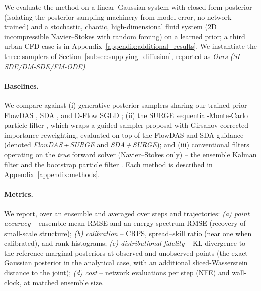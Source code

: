 
\newcommand{\figbox}[3]{%
  \setlength{\fboxsep}{2pt}%
  \fcolorbox{gray!55}{gray!12}{%
    \parbox[c][#2][c]{#1}{\centering\ttfamily\scriptsize
      [figure placeholder]\\[2pt]#3}}%
}

We evaluate the method on a linear--Gaussian system with closed-form posterior (isolating the posterior-sampling machinery from model error, no network trained) and a stochastic, chaotic, high-dimensional fluid system (2D incompressible Navier--Stokes with random forcing) on a learned prior; a third urban-CFD case is in Appendix~\ref{appendix:additional_results}. We instantiate the three samplers of Section~\ref{subsec:supplying_diffusion}, reported as \emph{Ours (SI-SDE/DM-SDE/FM-ODE)}.

\paragraph{Baselines.}
We compare against (i) generative posterior samplers sharing our trained prior -- FlowDAS \cite{chen_flowdas_2025}, SDA \cite{rozet_score-based_2023}, and D-Flow SGLD \cite{parikh_d-flow_2026,ben-hamu_d-flow_2024}; (ii) the SURGE sequential-Monte-Carlo particle filter \cite{wei_surge_2026}, which wraps a guided-sampler proposal with Girsanov-corrected importance reweighting, evaluated on top of the FlowDAS and SDA guidance (denoted \emph{FlowDAS\,+\,SURGE} and \emph{SDA\,+\,SURGE}); and (iii) conventional filters operating on the \emph{true} forward solver (Navier--Stokes only) -- the ensemble Kalman filter \cite{evensen_data_2022} and the bootstrap particle filter \cite{carrassi_data_2018}. Each method is described in Appendix~\ref{appendix:methods}.

\paragraph{Metrics.}
We report, over an ensemble and averaged over steps and trajectories: \emph{(a) point accuracy} -- ensemble-mean RMSE and an energy-spectrum RMSE (recovery of small-scale structure); \emph{(b) calibration} -- CRPS, spread--skill ratio (near one when calibrated), and rank histograms; \emph{(c) distributional fidelity} -- KL divergence to the reference marginal posteriors at observed and unobserved points (the exact Gaussian posterior in the analytical case, with an additional sliced-Wasserstein distance to the joint); \emph{(d) cost} -- network evaluations per step (NFE) and wall-clock, at matched ensemble size.

